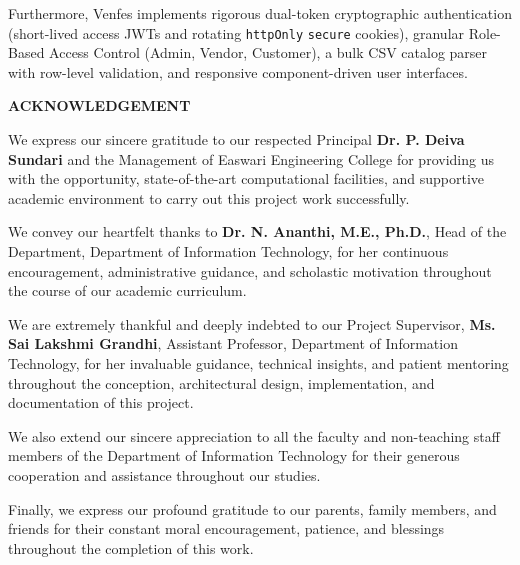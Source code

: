\documentclass[12pt,a4paper]{report}
\begin{document}
Furthermore, Venfes implements rigorous dual-token cryptographic authentication (short-lived access JWTs and rotating \texttt{httpOnly} \texttt{secure} cookies), granular Role-Based Access Control (Admin, Vendor, Customer), a bulk CSV catalog parser with row-level validation, and responsive component-driven user interfaces.

\newpage
\begin{center}
    {\fontsize{16pt}{20pt}\selectfont \textbf{ACKNOWLEDGEMENT}\par}
\end{center}
\vspace{0.6cm}

\noindent We express our sincere gratitude to our respected Principal \textbf{Dr. P. Deiva Sundari} and the Management of Easwari Engineering College for providing us with the opportunity, state-of-the-art computational facilities, and supportive academic environment to carry out this project work successfully.

\vspace{0.4cm}
\noindent We convey our heartfelt thanks to \textbf{Dr. N. Ananthi, M.E., Ph.D.}, Head of the Department, Department of Information Technology, for her continuous encouragement, administrative guidance, and scholastic motivation throughout the course of our academic curriculum.

\vspace{0.4cm}
\noindent We are extremely thankful and deeply indebted to our Project Supervisor, \textbf{Ms. Sai Lakshmi Grandhi}, Assistant Professor, Department of Information Technology, for her invaluable guidance, technical insights, and patient mentoring throughout the conception, architectural design, implementation, and documentation of this project.

\vspace{0.4cm}
\noindent We also extend our sincere appreciation to all the faculty and non-teaching staff members of the Department of Information Technology for their generous cooperation and assistance throughout our studies.

\vspace{0.4cm}
\noindent Finally, we express our profound gratitude to our parents, family members, and friends for their constant moral encouragement, patience, and blessings throughout the completion of this work.
\end{document}
